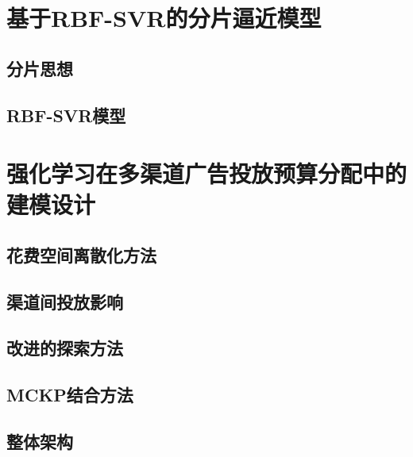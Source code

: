 \section{基于RBF-SVR的分片逼近模型}
\subsection{分片思想}
\subsection{RBF-SVR模型}

\section{强化学习在多渠道广告投放预算分配中的建模设计}
\subsection{花费空间离散化方法}
\subsection{渠道间投放影响}
\subsection{改进的探索方法}
\subsection{MCKP结合方法}
\subsection{整体架构}